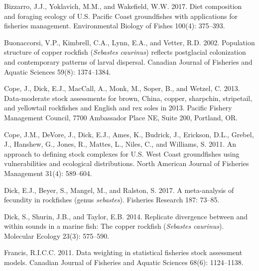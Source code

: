 \documentclass[11pt,
  english,
  a4paper,
]{article}
\newlength{\cslhangindent}
\newenvironment{CSLReferences}[2] %
 {%
  \setlength{\parindent}{0pt}
  \ifodd #1 \everypar{\setlength{\hangindent}{\cslhangindent}}\ignorespaces\fi
  \ifnum #2 > 0
  \setlength{\parskip}{#2\baselineskip}
  \fi
 }%
 {}
\begin{document}
\leavevmode\tagmcend\tagstructend


\hypertarget{refs}{}
\begin{CSLReferences}{1}{0}
\leavevmode{}%
Bizzarro, J.J., Yoklavich, M.M., and Wakefield, W.W. 2017. Diet composition and foraging ecology of {U}.{S}. {Pacific} {Coast} groundfishes with applications for fisheries management. Environmental Biology of Fishes 100(4): 375--393.

\leavevmode{}%
Buonaccorsi, V.P., Kimbrell, C.A., Lynn, E.A., and Vetter, R.D. 2002. Population structure of copper rockfish (\emph{{Sebastes} caurinus}) reflects postglacial colonization and contemporary patterns of larval dispersal. Canadian Journal of Fisheries and Aquatic Sciences 59(8): 1374--1384.

\leavevmode{}%
Cope, J., Dick, E.J., MacCall, A., Monk, M., Soper, B., and Wetzel, C. 2013. Data-moderate stock assessments for brown, {China}, copper, sharpchin, stripetail, and yellowtail rockfishes and {English} and rex soles in 2013. Pacific Fishery Management Council, 7700 Ambassador Place NE, Suite 200, Portland, OR.

\leavevmode{}%
Cope, J.M., DeVore, J., Dick, E.J., Ames, K., Budrick, J., Erickson, D.L., Grebel, J., Hanshew, G., Jones, R., Mattes, L., Niles, C., and Williams, S. 2011. An approach to defining stock complexes for {U}.{S}. {West} {Coast} groundfishes using vulnerabilities and ecological distributions. North American Journal of Fisheries Management 31(4): 589--604.

\leavevmode{}%
Dick, E.J., Beyer, S., Mangel, M., and Ralston, S. 2017. A meta-analysis of fecundity in rockfishes (genus \emph{sebastes}). Fisheries Research 187: 73--85.

\leavevmode{}%
Dick, S., Shurin, J.B., and Taylor, E.B. 2014. Replicate divergence between and within sounds in a marine fish: The copper rockfish (\emph{{Sebastes} caurinus}). Molecular Ecology 23(3): 575--590.

\leavevmode{}%
Francis, R.I.C.C. 2011. Data weighting in statistical fisheries stock assessment models. Canadian Journal of Fisheries and Aquatic Sciences 68(6): 1124--1138.


\end{CSLReferences}
\end{document}
